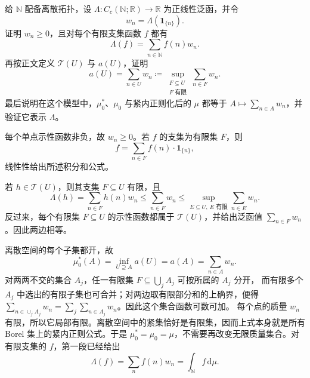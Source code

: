 \begin{exercise}[离散空间上的测度表示]\label{b1:ex:11-discrete-construction}
给 \(\mathbb N\) 配备离散拓扑，设 \(\Lambda:C_c(\mathbb N;\mathbb R)\to\mathbb R\) 为正线性泛函，并令
\[
 w_n=\Lambda(\mathbf1_{\{n\}}).
\]
证明 \(w_n\geq0\)，且对每个有限支集函数 \(f\) 都有
\[
 \Lambda(f)=\sum_{n\in\mathbb N}f(n)w_n.
\]
再按正文定义 \(\mathcal T(U)\) 与 \(a(U)\)，证明
\[
 a(U)=\sum_{n\in U}w_n
 \coloneqq\sup_{\substack{F\subseteq U\\F\text{ 有限}}}\sum_{n\in F}w_n.
\]
最后说明在这个模型中，\(\mu_0^*\)、\(\mu_0\) 与紧内正则化后的 \(\mu\) 都等于
\(A\mapsto\sum_{n\in A}w_n\)，并验证它表示 \(\Lambda\)。
\end{exercise}
\begin{solution}
每个单点示性函数非负，故 \(w_n\geq0\)。若 \(f\) 的支集为有限集 \(F\)，则
\[
 f=\sum_{n\in F}f(n)\cdot\mathbf1_{\{n\}},
\]
线性性给出所述积分和公式。

若 \(h\in\mathcal T(U)\)，则其支集 \(F\subseteq U\) 有限，且
\[
 \Lambda(h)=\sum_{n\in F}h(n)w_n\leq\sum_{n\in F}w_n
 \leq\sup_{E\subseteq U,\ E\text{ 有限}}\sum_{n\in E}w_n.
\]
反过来，每个有限集 \(F\subseteq U\) 的示性函数都属于 \(\mathcal T(U)\)，并给出泛函值 \(\sum_{n\in F}w_n\)。因此两边相等。

离散空间的每个子集都开，故
\[
 \mu_0^*(A)=\inf_{U\supseteq A}a(U)=a(A)=\sum_{n\in A}w_n.
\]
对两两不交的集合 \(A_j\)，任一有限集 \(F\subseteq\bigcup_jA_j\) 可按所属的 \(A_j\) 分开，
而有限多个 \(A_j\) 中选出的有限子集也可合并；对两边取有限部分和的上确界，便得
\(\sum_{n\in\cup_jA_j}w_n=\sum_j\sum_{n\in A_j}w_n\)。因此这个集合函数可数可加。
每个点的质量 \(w_n\) 有限，所以它局部有限。离散空间中的紧集恰好是有限集，因而上式本身就是所有 Borel 集上的紧内正则公式。于是 \(\mu_0^*=\mu_0=\mu\)，不需要再改变无限质量集合。对有限支集的 \(f\)，第一段已经给出
\[
 \Lambda(f)=\sum_n f(n)w_n=\int_{\mathbb N}f\,\mathrm d\mu.
\]
\end{solution}

